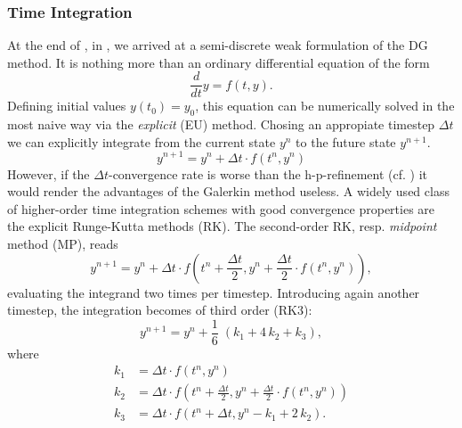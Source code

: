 \subsubsection{Time Integration}
\label{sec:time-integration}

At the end of , in , we
arrived at a semi-discrete weak formulation of the DG method. It is nothing
more than an ordinary differential equation of the form
\begin{equation}
\frac{d}{dt}y = f(t,y).
\end{equation}
Defining initial values $y(t_0) = y_0$, this equation can be numerically solved
in the most naive way via the \emph{explicit}  (EU) method. Chosing
an appropiate timestep $\Delta t$ we can explicitly integrate from the current
state $y^n$ to the future state $y^{n+1}$.
\begin{equation}
    y^{n+1} = y^{n} + \Delta t \cdot f(t^n,y^n)
\end{equation}
However, if the $\Delta t$-convergence rate is worse than the h-p-refinement
(cf. ) it would render the advantages of the Galerkin
method useless. A widely used class of higher-order time integration schemes
with good convergence properties are the explicit Runge-Kutta methods (RK). The
second-order RK, resp. \emph{midpoint} method (MP), reads
\begin{equation}
    y^{n+1} = y^{n} + \Delta t \cdot f\left(t^n + \frac{\Delta t}{2},y^n + \frac{\Delta t}{2} \cdot f(t^n,y^n)\right),
\end{equation}
evaluating the integrand two times per timestep. Introducing again another timestep,
the integration becomes of third order (RK3):
\begin{equation}
    y^{n+1} = y^{n} + \frac{1}{6}\;(k_1 + 4\,k_2 + k_3),
\end{equation}
where 
\begin{align}
    k_1 &= \Delta t \cdot f(t^n,y^n) \\[0.4cm]
    k_2 &= \Delta t \cdot f\left(t^n + \frac{\Delta t}{2},y^n + \frac{\Delta t}{2} \cdot f(t^n,y^n)\right) \\[0.4cm]
    k_3 &= \Delta t \cdot f\left(t^n + \Delta t,y^n - k_1 + 2\,k_2\right).
\end{align}

